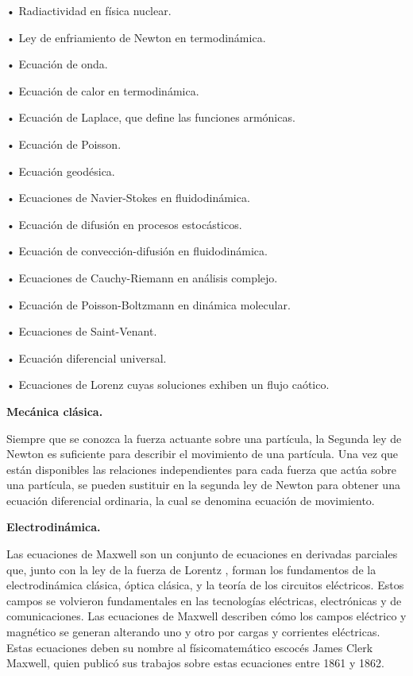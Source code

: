 \textcolor{ForestGreen!80}{•	Radiactividad en física nuclear.}

\textcolor{ForestGreen!80}{•	Ley de enfriamiento de Newton en termodinámica.}

\textcolor{ForestGreen!80}{•	Ecuación de onda.}

\textcolor{ForestGreen!80}{•	Ecuación de calor en termodinámica.}

\textcolor{ForestGreen!80}{•	Ecuación de Laplace, que define las funciones armónicas.}

\textcolor{ForestGreen!80}{•	Ecuación de Poisson.}

\textcolor{ForestGreen!80}{•	Ecuación geodésica.}

\textcolor{ForestGreen!80}{•	Ecuaciones de Navier-Stokes en fluidodinámica.}

\textcolor{ForestGreen!80}{•	Ecuación de difusión en procesos estocásticos.}

\textcolor{ForestGreen!80}{•	Ecuación de convección-difusión en fluidodinámica.}

\textcolor{ForestGreen!80}{•	Ecuaciones de Cauchy-Riemann en análisis complejo.}

\textcolor{ForestGreen!80}{•	Ecuación de Poisson-Boltzmann en dinámica molecular.}

\textcolor{ForestGreen!80}{•	Ecuaciones de Saint-Venant.}

\textcolor{ForestGreen!80}{•	Ecuación diferencial universal.}

\textcolor{ForestGreen!80}{•	Ecuaciones de Lorenz cuyas soluciones exhiben un flujo caótico.}

\textcolor{ForestGreen!80}{\textbf{Mecánica clásica.}}


\textcolor{ForestGreen!80}{Siempre que se conozca la fuerza actuante sobre una partícula, la Segunda ley de Newton es suficiente para describir el movimiento de una partícula. Una vez que están disponibles las relaciones independientes para cada fuerza que actúa sobre una partícula, se pueden sustituir en la segunda ley de Newton para obtener una ecuación diferencial ordinaria, la cual se denomina ecuación de movimiento}.

\textcolor{ForestGreen!80}{\textbf{Electrodinámica.}}

\textcolor{ForestGreen!80}{Las ecuaciones de Maxwell son un conjunto de ecuaciones en derivadas parciales que, junto con la ley de la fuerza de Lorentz , forman los fundamentos de la electrodinámica clásica, óptica clásica, y la teoría de los circuitos eléctricos. Estos campos se volvieron fundamentales en las tecnologías eléctricas, electrónicas y de comunicaciones. Las ecuaciones de Maxwell describen cómo los campos eléctrico y magnético se generan alterando uno y otro por cargas y corrientes eléctricas. Estas ecuaciones deben su nombre al físicomatemático escocés James Clerk Maxwell, quien publicó sus trabajos sobre estas ecuaciones entre 1861 y 1862.}

